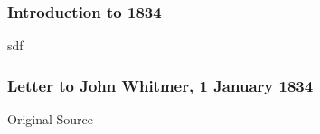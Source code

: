 		\subsubsection{Introduction to 1834}
		
			sdf
			
		\subsubsection{Letter to John Whitmer, 1 January 1834}
			\label{EMS-1834-OC-1-JAN-1834}
			

					
				
				
				
				\begin{description}
					\item[Original Source]
				\end{description}
				
